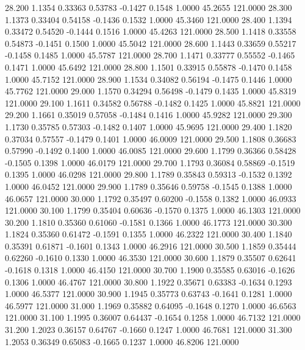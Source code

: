   28.200   1.1354   0.33363   0.53783  -0.1427   0.1548   1.0000  45.2655 121.0000
  28.300   1.1373   0.33404   0.54158  -0.1436   0.1532   1.0000  45.3460 121.0000
  28.400   1.1394   0.33472   0.54520  -0.1444   0.1516   1.0000  45.4263 121.0000
  28.500   1.1418   0.33558   0.54873  -0.1451   0.1500   1.0000  45.5042 121.0000
  28.600   1.1443   0.33659   0.55217  -0.1458   0.1485   1.0000  45.5787 121.0000
  28.700   1.1471   0.33777   0.55552  -0.1465   0.1471   1.0000  45.6492 121.0000
  28.800   1.1501   0.33915   0.55878  -0.1470   0.1458   1.0000  45.7152 121.0000
  28.900   1.1534   0.34082   0.56194  -0.1475   0.1446   1.0000  45.7762 121.0000
  29.000   1.1570   0.34294   0.56498  -0.1479   0.1435   1.0000  45.8319 121.0000
  29.100   1.1611   0.34582   0.56788  -0.1482   0.1425   1.0000  45.8821 121.0000
  29.200   1.1661   0.35019   0.57058  -0.1484   0.1416   1.0000  45.9282 121.0000
  29.300   1.1730   0.35785   0.57303  -0.1482   0.1407   1.0000  45.9695 121.0000
  29.400   1.1820   0.37034   0.57557  -0.1479   0.1401   1.0000  46.0009 121.0000
  29.500   1.1808   0.36683   0.57990  -0.1492   0.1400   1.0000  46.0085 121.0000
  29.600   1.1799   0.36366   0.58428  -0.1505   0.1398   1.0000  46.0179 121.0000
  29.700   1.1793   0.36084   0.58869  -0.1519   0.1395   1.0000  46.0298 121.0000
  29.800   1.1789   0.35843   0.59313  -0.1532   0.1392   1.0000  46.0452 121.0000
  29.900   1.1789   0.35646   0.59758  -0.1545   0.1388   1.0000  46.0657 121.0000
  30.000   1.1792   0.35497   0.60200  -0.1558   0.1382   1.0000  46.0933 121.0000
  30.100   1.1799   0.35404   0.60636  -0.1570   0.1375   1.0000  46.1303 121.0000
  30.200   1.1810   0.35360   0.61060  -0.1581   0.1366   1.0000  46.1773 121.0000
  30.300   1.1824   0.35360   0.61472  -0.1591   0.1355   1.0000  46.2322 121.0000
  30.400   1.1840   0.35391   0.61871  -0.1601   0.1343   1.0000  46.2916 121.0000
  30.500   1.1859   0.35444   0.62260  -0.1610   0.1330   1.0000  46.3530 121.0000
  30.600   1.1879   0.35507   0.62641  -0.1618   0.1318   1.0000  46.4150 121.0000
  30.700   1.1900   0.35585   0.63016  -0.1626   0.1306   1.0000  46.4767 121.0000
  30.800   1.1922   0.35671   0.63383  -0.1634   0.1293   1.0000  46.5377 121.0000
  30.900   1.1945   0.35773   0.63743  -0.1641   0.1281   1.0000  46.5977 121.0000
  31.000   1.1969   0.35882   0.64095  -0.1648   0.1270   1.0000  46.6563 121.0000
  31.100   1.1995   0.36007   0.64437  -0.1654   0.1258   1.0000  46.7132 121.0000
  31.200   1.2023   0.36157   0.64767  -0.1660   0.1247   1.0000  46.7681 121.0000
  31.300   1.2053   0.36349   0.65083  -0.1665   0.1237   1.0000  46.8206 121.0000
